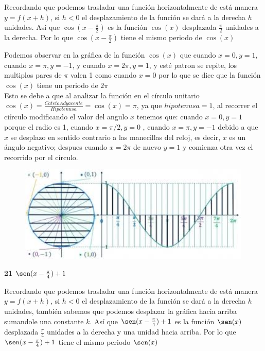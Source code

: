 \documentclass[12pt, letterpaper]{article}
\begin{document}
Recordando que podemos trasladar una función horizontalmente de está manera $y = f(x+h)$, si $h < 0$ el desplazamiento de la función se dará a la derecha $h$ unidades. Así que $\cos (x - \frac{\pi}{2})$ es la función $\cos (x)$ desplazada $\frac{\pi}{2}$ unidades  a la derecha. Por lo que  $\cos (x - \frac{\pi}{2})$ tiene el mismo periodo de $\cos (x)$

Podemos observar en la gráfica de la función $\cos(x)$ que cuando $x = 0, y = 1$, cuando $x=\pi, y= -1$, y cuando $x = 2\pi, y=1$, y esté patron se repite, los multiplos pares de $\pi$ valen 1 como cuando $x = 0$ por lo que se dice que la función $\cos (x)$ tiene un periodo de $2\pi$\\

Esto se debe a que al analizar la función en el círculo unitario $\cos (x) = \frac{CatetoAdyacente}{Hipotenusa} = \cos(x) = \pi$, ya que  $hipotenusa=1$, al recorrer el ciírculo modificando el valor del angulo $x$ tenemos que: cuando $x = 0, y=1$ porque el radio es 1,  cuando $x = \pi / 2, y = 0$ ,  cuando $x = \pi, y = -1$ debido a que $x$ se desplazo en sentido contrario a las manecillas del reloj, es decir, $x$ es un ángulo negativo; despues cuando $x=2\pi$ de nuevo $y=1$ y comienza otra vez el recorrido por el círculo.
\begin{figure}[ht]
\centering
\includegraphics[width=30em]{t7tres}
\end{figure}

\newpage

\textbf{21} $\sen (x - \frac{\pi}{4}) + 1$

Recordando que podemos trasladar una función horizontalmente de está manera $y = f(x+h)$, si $h < 0$ el desplazamiento de la función se dará a la derecha $h$ unidades, también sabemos que podemos desplazar la gráfica hacia arriba sumandole una constante $k$. Así que $\sen (x - \frac{\pi}{4}) + 1$ es la función $\sen (x)$ desplazada $\frac{\pi}{4}$ unidades  a la derecha y una unidad hacia arriba. Por lo que $\sen (x - \frac{\pi}{4}) + 1$ tiene el mismo periodo $\sen (x)$
\end{document}
